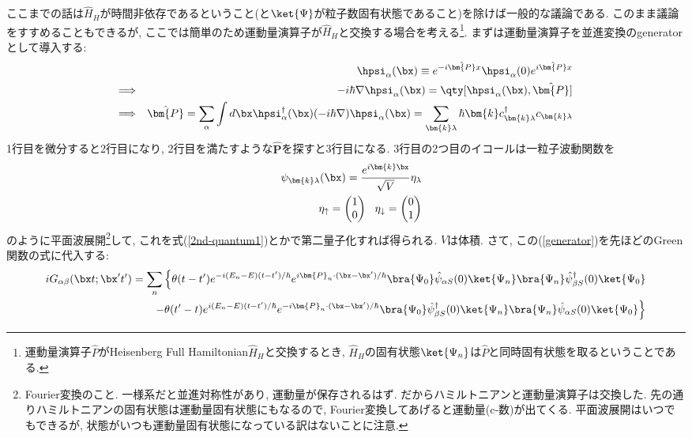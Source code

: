 \documentclass[10.5pt,a4paper]{jreport}
\begin{document}
ここまでの話は$\hat{H}_H$が時間非依存であるということ(と$\ket{\Psi}$が粒子数固有状態であること)を除けば一般的な議論である. このまま議論をすすめることもできるが, ここでは簡単のため運動量演算子が$\hat{H}_H$と交換する場合を考える\footnote{運動量演算子$\hat{P}$がHeisenberg Full Hamiltonian$\hat{H}_H$と交換するとき, $\hat{H}_H$の固有状態$\ket{\Psi_n}$は$\hat{P}$と同時固有状態を取るということである.}. まずは運動量演算子を並進変換のgeneratorとして導入する:
\begin{eqnarray}
  &&\hpsi_\alpha(\bx) \equiv e^{-i\hat{\bm{P}}x}\hpsi_\alpha(0)e^{i\hat{\bm{P}}x}\label{generator}\\
  \Longrightarrow&& -i\hbar\nabla\hpsi_\alpha(\bx) = \qty[\hpsi_\alpha(\bx), \hat{\bm{P}}]\\
  \Longrightarrow&& \hat{\bm{P}} = \sum_\alpha\int d\bx \hpsi^\dagger_\alpha(\bx)(-i\hbar\nabla)\hpsi_\alpha(\bx) = \sum_{\bm{k}\lambda}\hbar\bm{k}c^\dagger_{\bm{k}\lambda}c_{\bm{k}\lambda}
\end{eqnarray}
1行目を微分すると2行目になり, 2行目を満たすような$\hat{\bm{P}}$を探すと3行目になる. 3行目の2つ目のイコールは一粒子波動関数を
\begin{eqnarray}
  &&\psi_{\bm{k}\lambda}(\bx) = \frac{e^{i\bm{k}\bx}}{\sqrt{V}}\eta_{\lambda}\label{1st-plane}\\
  &&\eta_\uparrow =
  \begin{pmatrix}
    1\\
    0
  \end{pmatrix} \ \ \eta_\downarrow =
  \begin{pmatrix}
    0\\
    1
  \end{pmatrix}
\end{eqnarray}
のように平面波展開\footnote{Fourier変換のこと. 一様系だと並進対称性があり, 運動量が保存されるはず. だからハミルトニアンと運動量演算子は交換した. 先の通りハミルトニアンの固有状態は運動量固有状態にもなるので, Fourier変換してあげると運動量(c-数)が出てくる. 平面波展開はいつでもできるが, 状態がいつも運動量固有状態になっている訳はないことに注意. }して, これを式(\ref{2nd-quantum1})とかで第二量子化すれば得られる. $V$は体積. さて, この(\ref{generator})を先ほどのGreen関数の式に代入する:
\begin{eqnarray}
  \nonumber    iG_{\alpha\beta}(\bx t;\bx' t') = \sum_n\Big\{\theta(t-t')e^{-i(E_n-E)(t-t')/\hbar}e^{i\bm{P}_n\cdot(\bx - \bx')/\hbar}\bra{\Psi_0}\hat{\psi}_{\alpha S}(0)\ket{\Psi_n}\bra{\Psi_n}\hat{\psi}^\dagger_{\beta S}(0)\ket{\Psi_0}\\
  -\theta(t'-t)e^{i(E_n-E)(t-t')/\hbar}e^{-i\bm{P}_n\cdot(\bx - \bx')/\hbar}\bra{\Psi_0}\hat{\psi}^\dagger_{\beta S}(0)\ket{\Psi_n}\bra{\Psi_n}\hat{\psi}_{\alpha S}(0)\ket{\Psi_0}\Big\}
\end{eqnarray}
\end{document}
